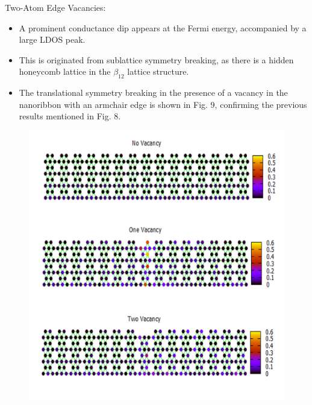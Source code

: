 \documentclass[handout,t]{beamer}
\begin{document}
\begin{frame}{Two-Atom Edge Vacancies:}
	\begin{itemize}
		\item A prominent conductance dip appears at the Fermi energy, accompanied by a large LDOS peak.
		\item This is originated from sublattice symmetry breaking, as there is a hidden honeycomb lattice in the $\beta_{12}$ lattice structure.
		\item  The translational symmetry breaking in the presence of a vacancy in the nanoribbon with an armchair edge is shown in Fig. 9, confirming the previous results mentioned in Fig. 8. 
	\end{itemize}
	\begin{figure}[!ht]
		\centering
		\includegraphics[width=0.4\linewidth]{../figures/Slide5.PNG}
		\label{armVSLDOS}
	  \end{figure}
\end{frame}
\end{document}
